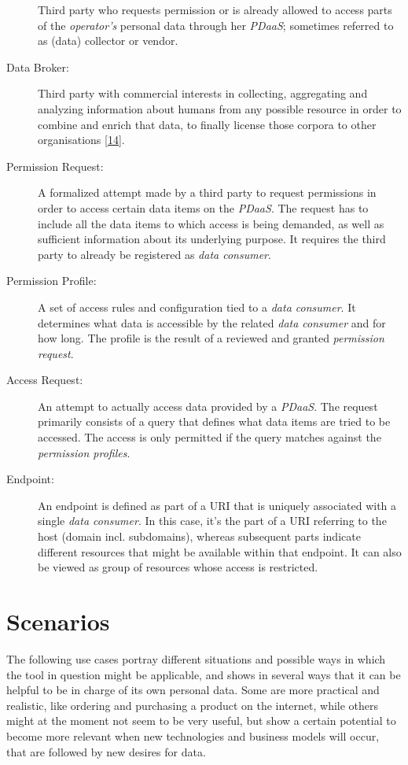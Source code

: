 \documentclass[12pt,english,a4paper,titlepage,cleardoublepage=empty,dottedtoc]{report}
\begin{document}
\begin{description}
Third party who requests permission or is already allowed to access
parts of the \emph{operator's} personal data through her \emph{PDaaS};
sometimes referred to as (data) collector or vendor.
\item[\protect\hypertarget{terminologies--data-broker}{}{Data Broker}:]
Third party with commercial interests in collecting, aggregating and
analyzing information about humans from any possible resource in order
to combine and enrich that data, to finally license those corpora to
other organisations
{[}\protect\hyperlink{ref-report_2014_data-brokers}{14}{]}.
\item[Permission Request:]
A formalized attempt made by a third party to request permissions in
order to access certain data items on the \emph{PDaaS}. The request has
to include all the data items to which access is being demanded, as well
as sufficient information about its underlying purpose. It requires the
third party to already be registered as \emph{data consumer}.
\item[Permission Profile:]
A set of access rules and configuration tied to a \emph{data consumer}.
It determines what data is accessible by the related \emph{data
consumer} and for how long. The profile is the result of a reviewed and
granted \emph{permission request}.
\item[Access Request:]
An attempt to actually access data provided by a \emph{PDaaS}. The
request primarily consists of a query that defines what data items are
tried to be accessed. The access is only permitted if the query matches
against the \emph{permission profiles}.
\item[Endpoint:]
An endpoint is defined as part of a URI that is uniquely associated with
a single \emph{data consumer}. In this case, it's the part of a URI
referring to the host (domain incl. subdomains), whereas subsequent
parts indicate different resources that might be available within that
endpoint. It can also be viewed as group of resources whose access is
restricted.
\end{description}

\hypertarget{scenarios}{\section{Scenarios}\label{scenarios}}

The following use cases portray different situations and possible ways
in which the tool in question might be applicable, and shows in several
ways that it can be helpful to be in charge of its own personal data.
Some are more practical and realistic, like ordering and purchasing a
product on the internet, while others might at the moment not seem to be
very useful, but show a certain potential to become more relevant when
new technologies and business models will occur, that are followed by
new desires for data.
\end{document}
